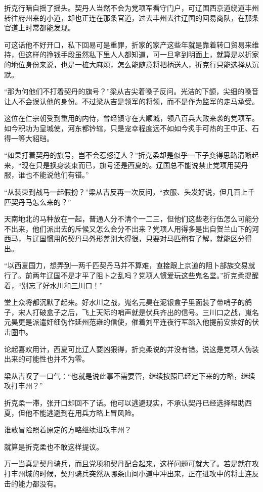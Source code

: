 折克行暗自摇了摇头。契丹人当然不会为党项军看守门户，可辽国西京道绕道丰州转往府州来的小道，却也正连在那条官道，过去丰州去往辽国的回易商队，在那条官道上时常都能发现。

可这话他不好开口，私下回易可是重罪，折家的家产这些年就是靠着转口贸易来维持，但这样的挣钱手段虽然私下里人人都知道，可一旦拿到明面上，就算是以折家的地位身份来说，也是一桩大麻烦，怎么能随意将把柄送人，折克行只能选择从沉默。

“那为何他们不打着契丹的旗号？”梁从吉尖着嗓子反问。光洁的下颌，尖细的嗓音让人不会误认他的身份。不过梁从吉是领军的将领，而不是作为监军的走马承受。

这位在仁宗朝受到重用的内侍，曾经镇守在大顺城，领八百兵大败来袭的党项军。如今积功为皇城使，河东都钤辖，只是宠幸程度远不如如今炙手可热的王中正、石得一等大貂珰。

“如果打着契丹的旗号，岂不会惹怒辽人？”折克柔却是似乎一下子变得思路清晰起来，“现在只是换身装束而已，旗号还是西夏的。辽国总不能说禁止党项用契丹服，谁也不能说他们有错。”

“从装束到战马一起假扮？”梁从吉反再一次反问，“衣服、头发好说，但几百上千匹契丹马怎么来的？”

天南地北的马种放在一起，普通人分不清个一二三，但他们这些老行伍怎么可能分不出来，他们派出去的斥候又怎么会分不出来？党项人用得多是出自贺兰山下的河西马，与辽国惯用的契丹马外形差别大得很，只要对马匹稍有了解，就能区分得出。

“以西夏国力，想弄到一两千匹契丹马并不算难，直接跟上京道的阻卜部族交易就行了。前两年辽国不是才平了阻卜之乱吗？党项人惯爱玩这些鬼名堂。”折克柔提醒着，“别忘了好水川和三川口！”

堂上众将都沉默了起来。好水川之战，嵬名元昊在泥银盒子里面装了带哨子的鸽子，宋人打破盒子之后，飞上天际的哨声就是伏兵齐出的信号。三川口之战，嵬名元昊更是派遣奸细伪作延州范雍的信使，催着刘平连夜行军踏入他提前安排好的伏击圈中。

论起喜欢用计，西夏可比辽人要凶狠得，折克柔说的并没有错。说这是党项人伪装出来的可能性也并不为零。

梁从吉叹了一口气：“也就是说此事不需要管，继续按照已经定下来的方略，继续攻打丰州？”

折克柔一滞，张开口却回不了话。他可以逃避现实，不承认契丹已经选择帮助西夏，但他不能逃避到在用兵方略上冒风险。

谁敢冒险照着原定的方略继续进攻丰州？

就算是折克柔也不敢这样提议。

万一当真是契丹骑兵，而且党项和契丹配合起来，这样问题可就大了。若是就在攻打丰州城的时候，契丹骑兵突然从哪条山间小道中冲出来，正在进攻中的将士连反击的能力都没有。

